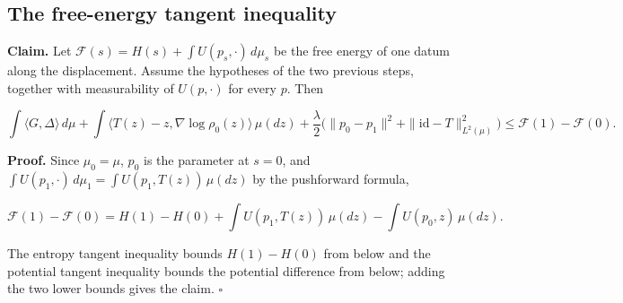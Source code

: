 \documentclass[11pt,a4paper]{report}
\begin{document}
\subsection{\texorpdfstring{The free-energy tangent inequality}{The free-energy tangent inequality}}


\textbf{Claim.} Let \(\mathcal F(s)=H(s)+\int U(p_s,\cdot)\,d\mu_s\) be the free energy of one datum along the displacement. Assume the hypotheses of the two previous steps, together with measurability of \(U(p,\cdot)\) for every \(p\). Then


\[\int\langle G,\Delta\rangle\,d\mu+\int\langle T(z)-z,\nabla\log\rho_0(z)\rangle\,\mu(dz)+\frac\lambda2\bigl(\|p_0-p_1\|^2+\|\mathrm{id}-T\|_{L^2(\mu)}^2\bigr)\le\mathcal F(1)-\mathcal F(0).\]


\textbf{Proof.} Since \(\mu_0=\mu\), \(p_0\) is the parameter at \(s=0\), and \(\int U(p_1,\cdot)\,d\mu_1=\int U(p_1,T(z))\,\mu(dz)\) by the pushforward formula,


\[\mathcal F(1)-\mathcal F(0)=H(1)-H(0)+\int U(p_1,T(z))\,\mu(dz)-\int U(p_0,z)\,\mu(dz).\]


The entropy tangent inequality bounds \(H(1)-H(0)\) from below and the potential tangent inequality bounds the potential difference from below; adding the two lower bounds gives the claim. \(\square\)
\end{document}
